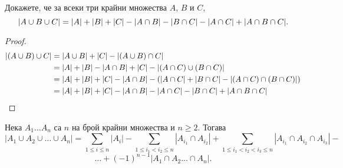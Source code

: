 \begin{prop}
  Докажете, че за всеки три крайни множества $A$, $B$ и $C$,
  \[\lvert{A\cup B \cup C}\rvert = \lvert{A}\rvert+\lvert{B}\rvert+\lvert{C}\rvert - \lvert{A\cap B}\rvert - \lvert{B\cap C}\rvert - \lvert{A\cap C}\rvert+ \lvert{A\cap B \cap C}\rvert.\]
\end{prop}
\begin{proof}
  \begin{align*}
    \lvert{(A \cup B) \cup C}\rvert & = \lvert{A \cup B}\rvert + \lvert{C}\rvert - \lvert{(A\cup B)\cap C}\rvert\\
    & = \lvert{A}\rvert + \lvert{B}\rvert - \lvert{A\cap B}\rvert + \lvert{C}\rvert - \lvert{(A\cap C)\cup(B\cap C)}\rvert\\
    & = \lvert{A}\rvert + \lvert{B}\rvert + \lvert{C}\rvert - \lvert{A\cap B}\rvert - (\lvert{A\cap C}\rvert + \lvert{B\cap C}\rvert - \lvert{(A\cap C) \cap (B\cap C)}\rvert)\\
    & = \lvert{A}\rvert + \lvert{B}\rvert + \lvert{C}\rvert - \lvert{A\cap B}\rvert - \lvert{A\cap C}\rvert - \lvert{B\cap C}\rvert + \lvert{A\cap B \cap C}\rvert
  \end{align*}
\end{proof}


\begin{thm}
  Нека $A_1\dots A_n$ са $n$ на брой крайни множества и $n\geq 2$.
  Тогава 
  \[|A_1\cup A_2\cup \dots \cup A_n| = \sum_{1\leq i\leq n} |A_i| - \sum_{1\leq i_1 < i_2\leq n} |A_{i_1}\cap A_{i_2}| + \sum_{1\leq i_1 < i_2 < i_3\leq n} |A_{i_1}\cap A_{i_2}\cap
  A_{i_3}| -
  \]\[\dots + (-1)^{n-1}|A_1 \cap A_2\dots \cap A_n|. \]
\end{thm}


